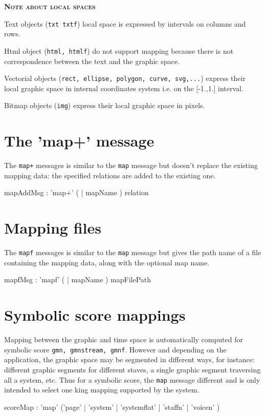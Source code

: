 \documentclass[a4paper,twoside]{report}
\newcommand{\sublevel}[1]	{\section{#1}}
\newcommand{\OSC}[1]		{\texttt{#1}}
\newcommand{\note}	[1]		{\vspace{2mm}\textbf{\hspace{-1.03cm}\textbf{\textsc{Note #1}}}}
\let\olditemize\itemize
\let\oldenditemize\enditemize
\renewenvironment{itemize} 	{\olditemize \setlength{\itemsep}{1mm}}{\oldenditemize}
\begin{document}
\note{about local spaces}
\begin{itemize}
\item Text objects (\OSC{txt txtf}) local space is expressed by intervals on columns and rows.
\item Html object (\OSC{html, htmlf}) do not support mapping because there is not correspondence between the text and the graphic space.
\item Vectorial objects (\OSC{rect, ellipse, polygon, curve, svg,...}) express their local graphic space in internal coordinates system i.e. on the [-1.,1.] interval.
\item Bitmap objects (\OSC{img}) express their local graphic space in pixels.
\end{itemize}


\sublevel{The 'map+' message}
\label{mapAddMsg}
The \OSC{map+} messages is similar to the \OSC{map} message but doesn't replace the existing mapping data: the specified relations are added to the existing one.

\begin{rail}
mapAddMsg : 'map+' ( | mapName ) relation
\end{rail}


\sublevel{Mapping files}
\label{mapFileMsg}
The \OSC{mapf} messages is similar to the \OSC{map} message but gives the path name of a file containing the mapping data, along with the optional map name.
\begin{rail}
mapfMsg : 'mapf' ( | mapName ) mapFilePath
\end{rail}



\sublevel{Symbolic score mappings}
\label{guidomap}

Mapping between the graphic and time space is automatically computed for symbolic score \OSC{gmn, gmnstream, gmnf}. However and depending on the application, the graphic space may be segmented in different ways, for instance: different graphic segments for different staves, a single graphic segment traversing all a system, etc. Thus for a symbolic score, the \OSC{map} message different and is only intended to select one king mapping supported by the system.

\begin{rail}
scoreMap : 'map' ('page' | 'system' | 'systemflat' | 'staffn' | 'voicen' )
\end{rail}
\end{document}
